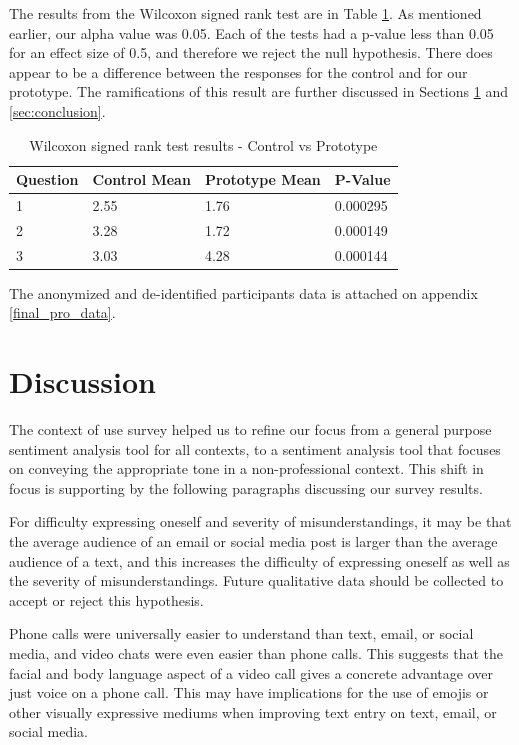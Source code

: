 \documentclass[acmsmall,screen,authorversion,nonacm]{acmart}
\begin{document}
The results from the Wilcoxon signed rank test are in Table \ref{tab:stats_results}. As mentioned earlier, our alpha value was 0.05. Each of the tests had a p-value less than 0.05 for an effect size of 0.5, and therefore we reject the null hypothesis. There does appear to be a difference between the responses for the control and for our prototype. The ramifications of this result are further discussed in Sections \ref{sec:discussion} and \ref{sec:conclusion}.

\begin{table}[H]
\begin{tabular}{|l|l|l|l|}
\hline
Question & Control Mean & Prototype Mean & P-Value \\ \hline
1 & 2.55 & 1.76 & 0.000295 \\ \hline
2 & 3.28 & 1.72 & 0.000149 \\ \hline
3 & 3.03 & 4.28 & 0.000144 \\ \hline

\end{tabular}
\caption{Wilcoxon signed rank test results - Control vs Prototype}
\label{tab:stats_results}
\end{table}

The anonymized and de-identified participants data is attached on appendix \ref{final_pro_data}. 


\section{Discussion}
\label{sec:discussion}
The context of use survey helped us to refine our focus from a general purpose sentiment analysis tool for all contexts, to a sentiment analysis tool that focuses on conveying the appropriate tone in a non-professional context. This shift in focus is supporting by the following paragraphs discussing our survey results.

For difficulty expressing oneself and severity of misunderstandings, it may be that the average audience of an email or social media post is larger than the average audience of a text, and this increases the difficulty of expressing oneself as well as the severity of misunderstandings. Future qualitative data should be collected to accept or reject this hypothesis. 

Phone calls were universally easier to understand than text, email, or social media, and video chats were even easier than phone calls. This suggests that the facial and body language aspect of a video call gives a concrete advantage over just voice on a phone call. This may have implications for the use of emojis or other visually expressive mediums when improving text entry on text, email, or social media.
\end{document}
